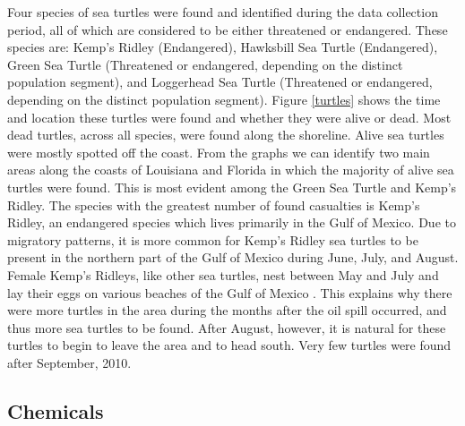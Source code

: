 \documentclass[authoryear,12pt]{elsarticle}
\begin{document}
Four species of sea turtles were found and identified during the data collection period, all of which are considered to be either threatened or endangered. These species are: Kemp's Ridley (Endangered), Hawksbill Sea Turtle (Endangered), Green Sea Turtle (Threatened or endangered, depending on the distinct population segment), and Loggerhead Sea Turtle (Threatened or endangered, depending on the distinct population segment). Figure \ref{turtles} shows the  {time and location} these turtles were found and whether they were {alive} or dead. Most dead turtles,  {across} all species, were found along the shoreline. Alive sea turtles were mostly spotted off the coast.  {From the graphs we can identify} two main areas along the coasts of Louisiana and Florida in which the  {majority} of  {a}live sea turtles were found.  This is most evident among the Green Sea Turtle and Kemp's Ridley. The species with the greatest number of found casualties  {is} Kemp's Ridley, an endangered species which lives primarily in the Gulf of Mexico.  Due to migratory patterns, it is more common for Kemp's Ridley sea turtles to be present in the northern part of the Gulf of Mexico during June, July, and August. Female Kemp's Ridleys, like other sea turtles, nest between May and July and lay their eggs on various beaches of the Gulf of Mexico  \citep{turtles}. This explains why there were more turtles in the area during the months after the oil spill occurred, and thus more sea turtles to be found.  After August, however, it is natural for these turtles to begin to leave the area and  {to} head south. Very few turtles were found after September, 2010.

\subsection{Chemicals}
\end{document}
